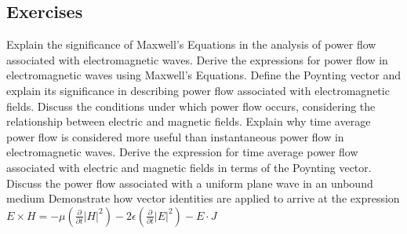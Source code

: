 \begin{mdframed}[backgroundcolor=lightblue, linewidth=1pt,  hidealllines=true]
\section{Exercises}
\begin{ExerciseList}
\Exercise[label={ex271}] Explain the significance of Maxwell's Equations in the analysis of power flow associated with electromagnetic waves.
\Exercise[label={ex272}] Derive the expressions for power flow in electromagnetic waves using Maxwell's Equations.
\Exercise[label={ex273}] Define the Poynting vector and explain its significance in describing power flow associated with electromagnetic fields.
\Exercise[label={ex274}] Discuss the conditions under which power flow occurs, considering the relationship between electric and magnetic fields.
\Exercise[label={ex275}] Explain why time average power flow is considered more useful than instantaneous power flow in electromagnetic waves.
\Exercise[label={ex276}] Derive the expression for time average power flow associated with electric and magnetic fields in terms of the Poynting vector.
\Exercise[label={ex277}] Discuss the power flow associated with a uniform plane wave in an unbound medium
\Exercise[label={ex278}] Demonstrate how vector identities are applied to arrive at the expression 
\(E \times H = -\mu\left(\frac{\partial}{\partial t} \lvert H \rvert^2\right) - 2\epsilon\left(\frac{\partial}{\partial t} \lvert E \rvert^2\right) - E \cdot J\)
\end{ExerciseList}
\end{mdframed}
